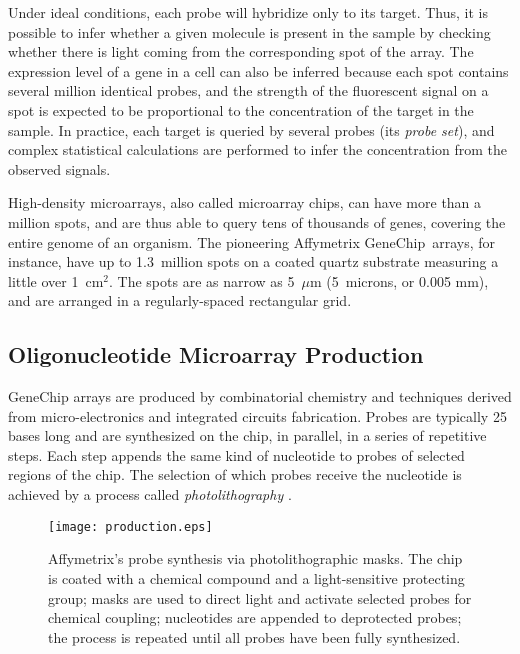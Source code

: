 Under ideal conditions, each probe will hybridize only to its target.  Thus,
it is possible to infer whether a given molecule is present in the sample by
checking whether there is light coming from the corresponding spot of the
array.  The expression level of a gene in a cell can also be inferred because
each spot contains several million identical probes, and the strength of the
fluorescent signal on a spot is expected to be proportional to the
concentration of the target in the sample. In practice, each target is queried
by several probes (its \emph{probe set}), and complex statistical calculations
are performed to infer the concentration from the observed signals.

High-density microarrays, also called microarray chips, can have more than a
million spots, and are thus able to query tens of thousands of genes, covering
the entire genome of an organism.  The pioneering Affymetrix GeneChip\textR\ 
arrays, for instance, have up to 1.3~million spots on a coated quartz
substrate measuring a little over 1~cm$^2$.  The spots are as narrow as
5~$\mu$m (5~microns, or 0.005 mm), and are arranged in a regularly-spaced
rectangular grid.

\subsection{Oligonucleotide Microarray Production}

GeneChip arrays are produced by combinatorial chemistry and techniques derived
from micro-electronics and integrated circuits fabrication. Probes are typically
25 bases long and are synthesized on the chip, in parallel, in a series of
repetitive steps. Each step appends the same kind of nucleotide to probes of
selected
regions of the chip. The selection of which probes receive the nucleotide is
achieved by a process called \emph{photolithography} \citep{Fodor1991}.

\begin{figure}\centering
\texttt{[image: production.eps]}
\caption{Affymetrix's probe synthesis via photolithographic masks. The chip is
  coated with a chemical compound and a light-sensitive protecting group;
  masks are used to direct light and activate selected probes for chemical
  coupling; nucleotides are appended to deprotected probes; the process is
  repeated until all probes have been fully synthesized.}
\label{fig:photolithography}
\end{figure}

